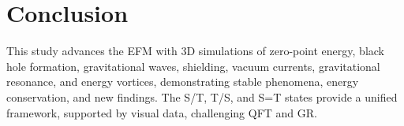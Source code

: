 \documentclass[11pt]{article}
\begin{document}
\section{Conclusion}
This study advances the EFM with 3D simulations of zero-point energy, black hole formation, gravitational waves, shielding, vacuum currents, gravitational resonance, and energy vortices, demonstrating stable phenomena, energy conservation, and new findings. The S/T, T/S, and S=T states provide a unified framework, supported by visual data, challenging QFT and GR.
\end{document}
